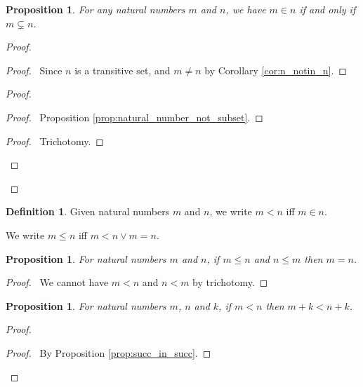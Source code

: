 \documentclass{report}
\let\qed\relax
\newtheorem{prop}[ax]{Proposition}
\theoremstyle{definition}
\newtheorem{df}[ax]{Definition}
\begin{document}
\begin{prop}
For any natural numbers $m$ and $n$, we have $m \in n$ if and only if $m \subsetneq n$.
\end{prop}

\begin{proof}
\pf
{}
\begin{proof}
	\pf\ Since $n$ is a transitive set, and $m \neq n$ by Corollary \ref{cor:n_notin_n}.
\end{proof}
\begin{proof}
	\begin{proof}
		\pf\ Proposition \ref{prop:natural_number_not_subset}.
	\end{proof}
	\begin{proof}
		\pf\ Trichotomy.
	\end{proof}
\end{proof}
\qed
\end{proof}

\begin{df}
Given natural numbers $m$ and $n$, we write $m < n$ iff $m \in n$.

We write $m \leq n$ iff $m < n \vee m = n$.
\end{df}

\begin{prop}
For natural numbers $m$ and $n$, if $m \leq n$ and $n \leq m$ then $m = n$.
\end{prop}

\begin{proof}
\pf\ We cannot have $m < n$ and $n < m$ by trichotomy. \qed
\end{proof}

\begin{prop}
\label{prop:plus_mono}
For natural numbers $m$, $n$ and $k$, if $m < n$ then $m + k < n + k$.
\end{prop}

\begin{proof}
\pf
{}
\begin{proof}
	\pf\ By Proposition \ref{prop:succ_in_succ}.
\end{proof}
\qed
\end{proof}
\end{document}
